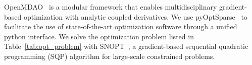 \documentclass[conf]{new-aiaa}
\begin{document}
OpenMDAO~\cite{Gray2019a} is a modular framework that enables multidisciplinary gradient-based optimization with analytic coupled derivatives.
We use pyOptSparse~\cite{Wu2020a} to facilitate the use of state-of-the-art optimization software through a unified python interface.
We solve the optimization problem listed in Table~\ref{tab:opt_problem} with SNOPT~\cite{Gill2005a}, a gradient-based sequential quadratic programming (SQP) algorithm for large-scale constrained problems.


\end{document}
